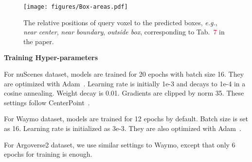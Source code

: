 \documentclass[10pt,twocolumn,letterpaper]{article}
\begin{document}
{\begin{figure}[t]
\begin{center}
   \texttt{[image: figures/Box-areas.pdf]}
   \caption{The relative positions of query voxel to the predicted boxes, {\em e.g.}, {\em near center}, {\em near boundary}, {\em outside box}, corresponding to Tab.~\textcolor{red}{7} in the paper.}
   \label{fig:boxe-areas}
\end{center}
\end{figure}
\vspace{0.5em}
\noindent
\textbf{Training Hyper-parameters}

For nuScenes dataset, models are trained for 20 epochs with batch size 16. They are optimized with Adam~\cite{adam}. Learning rate is initially 1e-3 and decays to 1e-4 in a cosine annealing. Weight decay is 0.01. Gradients are clipped by norm 35. These settings follow CenterPoint~\cite{centerpoint}. 

For Waymo dataset, models are trained for 12 epochs by default. Batch size is set as 16. Learning rate is initialized as 3e-3. They are also optimized with Adam~\cite{adam}. 

For Argoverse2 dataset, we use similar settings to Waymo, except that only 6 epochs for training is enough.

}
\end{document}
